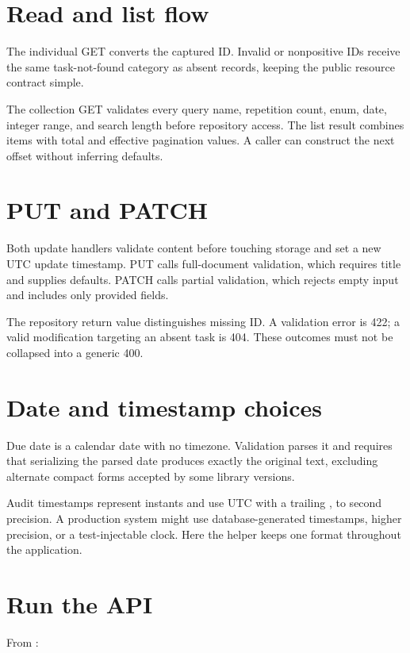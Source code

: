 \section{Read and list flow}

The individual GET converts the captured ID. Invalid or nonpositive IDs receive
the same task-not-found category as absent records, keeping the public resource
contract simple.

The collection GET validates every query name, repetition count, enum, date,
integer range, and search length before repository access. The list result
combines items with total and effective pagination values. A caller can construct
the next offset without inferring defaults.

\section{PUT and PATCH}

Both update handlers validate content before touching storage and set a new UTC
update timestamp. PUT calls full-document validation, which requires title and
supplies defaults. PATCH calls partial validation, which rejects empty input and
includes only provided fields.

The repository return value distinguishes missing ID. A validation error is 422;
a valid modification targeting an absent task is 404. These outcomes must not be
collapsed into a generic 400.

\section{Date and timestamp choices}

Due date is a calendar date with no timezone. Validation parses it and requires
that serializing the parsed date produces exactly the original text, excluding
alternate compact forms accepted by some library versions.

Audit timestamps represent instants and use UTC with a trailing , to
second precision. A production system might use database-generated timestamps,
higher precision, or a test-injectable clock. Here the helper keeps one format
throughout the application.

\section{Run the API}

From :

